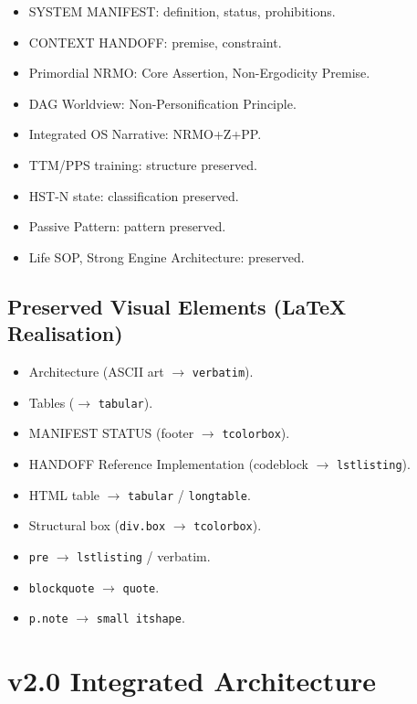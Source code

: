 \begin{itemize}
\item SYSTEM MANIFEST: definition, status, prohibitions.
\item CONTEXT HANDOFF: premise, constraint.
\item Primordial NRMO: Core Assertion, Non-Ergodicity Premise.
\item DAG Worldview: Non-Personification Principle.
\item Integrated OS Narrative: NRMO+Z+PP.
\item TTM/PPS training: structure preserved.
\item HST-N state: classification preserved.
\item Passive Pattern: pattern preserved.
\item Life SOP, Strong Engine Architecture: preserved.
\end{itemize}

\subsection{Preserved Visual Elements (\LaTeX{} Realisation)}

\begin{itemize}
\item Architecture (ASCII art $\to$ \texttt{verbatim}).
\item Tables ($\to$ \texttt{tabular}).
\item MANIFEST STATUS (footer $\to$ \texttt{tcolorbox}).
\item HANDOFF Reference Implementation (codeblock $\to$
\texttt{lstlisting}).
\item HTML table $\to$ \texttt{tabular} / \texttt{longtable}.
\item Structural box (\texttt{div.box} $\to$ \texttt{tcolorbox}).
\item \texttt{pre} $\to$ \texttt{lstlisting} / verbatim.
\item \texttt{blockquote} $\to$ \texttt{quote}.
\item \texttt{p.note} $\to$ \texttt{small itshape}.
\end{itemize}

\section{v2.0 Integrated Architecture}
\label{sec:v20-architecture-diagram}

